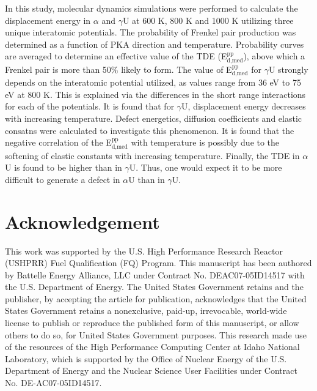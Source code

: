 \documentclass[review]{elsarticle}
\begin{document}
In this study, molecular dynamics simulations were performed to calculate the displacement energy in $\alpha$ and $\gamma$U at 600 K, 800 K and 1000 K utilizing three unique interatomic potentials. The probability of Frenkel pair production was determined as a function of PKA direction and temperature. Probability curves are averaged to determine an effective value of the TDE (E$^{\textrm{pp}}_{\textrm{d,med}}$), above which a Frenkel pair is more than 50$\%$ likely to form. The value of E$^{\textrm{pp}}_{\textrm{d,med}}$ for $\gamma$U strongly depends on the interatomic potential utilized, as values range from 36 eV to 75 eV at 800 K. This is explained via the differences in the short range interactions for each of the potentials. It is found that for $\gamma$U, displacement energy decreases with increasing temperature. Defect energetics, diffusion coefficients and elastic consatns were calculated to investigate this phenomenon. It is found that the negative correlation of the E$^{\textrm{pp}}_{\textrm{d,med}}$ with temperature is possibly due to the softening of elastic constants with increasing temperature. Finally, the TDE in $\alpha$U is found to be higher than in $\gamma$U. Thus, one would expect it to be more difficult to generate a defect in $\alpha$U than in $\gamma$U.

\section{Acknowledgement}
This work was supported by the U.S. High Performance Research Reactor (USHPRR) Fuel Qualification (FQ) Program. This manuscript has been authored by Battelle Energy Alliance, LLC under Contract No. DEAC07-05ID14517 with the U.S. Department of Energy. The United States Government retains and the publisher, by accepting the article for publication, acknowledges that the United States Government retains a nonexclusive, paid-up, irrevocable, world-wide license to publish or reproduce the published form of this manuscript, or allow others to do so, for United States Government purposes. This research made use of the resources of the High Performance Computing Center at Idaho National Laboratory, which is supported by the Office of Nuclear Energy of the U.S. Department of Energy and the Nuclear Science User Facilities under Contract No. DE-AC07-05ID14517.


\end{document}

